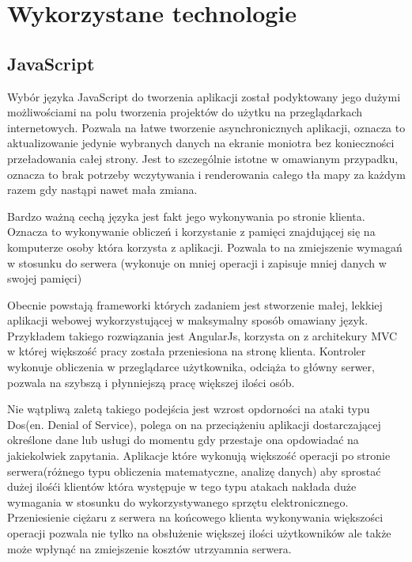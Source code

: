 \section{Wykorzystane technologie}
\label{sec:wykorzystanetechnologie}

\subsection{JavaScript}
\label{sec:javascript}

Wybór języka JavaScript do tworzenia aplikacji został podyktowany jego dużymi możliwościami na polu tworzenia projektów do użytku na przeglądarkach internetowych. Pozwala na łatwe tworzenie asynchronicznych aplikacji, oznacza to aktualizowanie jedynie wybranych danych na ekranie moniotra bez konieczności przeładowania całej strony. Jest to szczególnie istotne w omawianym przypadku, oznacza to brak potrzeby wczytywania i renderowania całego tła mapy za każdym razem gdy nastąpi nawet mała zmiana.

Bardzo ważną cechą języka jest fakt jego wykonywania po stronie klienta. Oznacza to wykonywanie obliczeń i korzystanie z pamięci znajdującej się na komputerze osoby która korzysta z aplikacji. Pozwala to na zmiejszenie wymagań w stosunku do serwera (wykonuje on mniej operacji i zapisuje mniej danych w swojej pamięci)

Obecnie powstają frameworki których zadaniem jest stworzenie małej, lekkiej aplikacji webowej wykorzystującej w maksymalny sposób omawiany język.\cite{AngularJS} Przykładem takiego rozwiązania jest AngularJs, korzysta on z architekury MVC w której większość pracy została przeniesiona na stronę klienta. Kontroler wykonuje obliczenia w przeglądarce użytkownika, odciąża to główny serwer, pozwala na szybszą i płynniejszą pracę większej ilości osób.

Nie wątpliwą zaletą takiego podejścia jest wzrost opdorności na ataki typu Dos(en. Denial of Service), polega on na przeciążeniu aplikacji dostarczającej określone dane lub usługi do momentu gdy przestaje ona opdowiadać na jakiekolwiek zapytania. Aplikacje które wykonują większość operacji po stronie serwera(różnego typu obliczenia matematyczne, analizę danych) aby sprostać dużej ilośći klientów która występuje w tego typu atakach nakłada duże wymagania w stosunku do wykorzystywanego sprzętu elektronicznego. Przeniesienie ciężaru z serwera na końcowego klienta wykonywania większości operacji pozwala nie tylko na obsłużenie większej ilości użytkowników ale także może wpłynąć na zmiejszenie kosztów utrzyamnia serwera.

